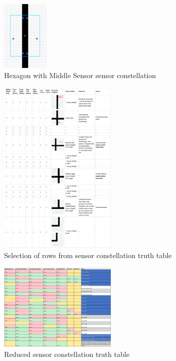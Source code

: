\documentclass[conference]{IEEEtran}
\begin{document}
\begin{figure}[htbp]
	\centerline{\includegraphics[width=0.2\textwidth]{constellation-hexagon-middle.png}}
	\caption{Hexagon with Middle Sensor sensor constellation}
	\label{fig:constellation-hexagon-middle}
\end{figure}

\begin{figure}[htbp]
	\centerline{\includegraphics[width=0.5\textwidth]{sensor-table.png}}
	\caption{Selection of rows from sensor constellation truth table}
	\label{fig:sensor-table}
\end{figure}
\begin{figure}[htbp]
	\centerline{\includegraphics[width=0.5\textwidth]{sensor-table-reduced.png}}
	\caption{Reduced sensor constellation truth table}
	\label{fig:sensor-table-reduced}
\end{figure}
\end{document}
